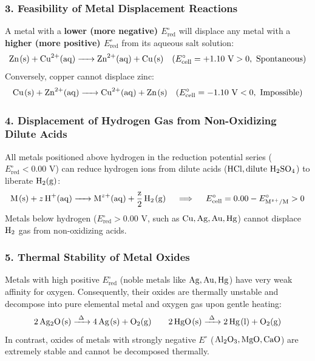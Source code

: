 \subsubsection{3. Feasibility of Metal Displacement Reactions}
A metal with a \textbf{lower (more negative) $E^\circ_{\text{red}}$} will displace any metal with a \textbf{higher (more positive) $E^\circ_{\text{red}}$} from its aqueous salt solution:
\begin{equation}
    \ce{Zn(s) + Cu^2+(aq) -> Zn^2+(aq) + Cu(s)} \quad (E^\circ_{\text{cell}} = +1.10\text{ V} > 0, \text{ Spontaneous})
\end{equation}
Conversely, copper cannot displace zinc:
\begin{equation}
    \ce{Cu(s) + Zn^2+(aq) -> Cu^2+(aq) + Zn(s)} \quad (E^\circ_{\text{cell}} = -1.10\text{ V} < 0, \text{ Impossible})
\end{equation}

\subsubsection{4. Displacement of Hydrogen Gas from Non-Oxidizing Dilute Acids}
All metals positioned above hydrogen in the reduction potential series ($E^\circ_{\text{red}} < 0.00\text{ V}$) can reduce hydrogen ions from dilute acids ($\ce{HCl}, \text{dilute } \ce{H2SO4}$) to liberate $\ce{H2(g)}$:
\begin{equation}
    \ce{M(s) + z H+(aq) -> M^{z+}(aq) + \frac{z}{2} H2(g)} \quad \implies \quad E^\circ_{\text{cell}} = 0.00 - E^\circ_{\ce{M^{z+}/M}} > 0
\end{equation}
Metals below hydrogen ($E^\circ_{\text{red}} > 0.00\text{ V}$, such as $\ce{Cu}, \ce{Ag}, \ce{Au}, \ce{Hg}$) cannot displace $\ce{H2}$ gas from non-oxidizing acids.

\subsubsection{5. Thermal Stability of Metal Oxides}
Metals with high positive $E^\circ_{\text{red}}$ (noble metals like $\ce{Ag}, \ce{Au}, \ce{Hg}$) have very weak affinity for oxygen. Consequently, their oxides are thermally unstable and decompose into pure elemental metal and oxygen gas upon gentle heating:
\begin{equation}
    \ce{2Ag2O(s) ->[\Delta] 4Ag(s) + O2(g)} \qquad \ce{2HgO(s) ->[\Delta] 2Hg(l) + O2(g)}
\end{equation}
In contrast, oxides of metals with strongly negative $E^\circ$ ($\ce{Al2O3}, \ce{MgO}, \ce{CaO}$) are extremely stable and cannot be decomposed thermally.

